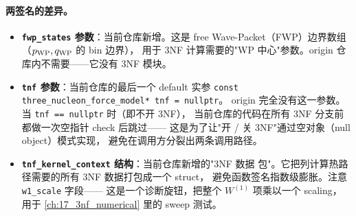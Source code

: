\paragraph{两签名的差异。}
\begin{itemize}
  \item \textbf{\texttt{fwp\_states} 参数}：当前仓库新增。这是 free
        Wave-Packet（FWP）边界数组（\(p_{\rm WP}, q_{\rm WP}\) 的 bin 边界），
        用于 3NF 计算需要的"WP 中心"参数。origin 仓库内不需要——它没有
        3NF 模块。
  \item \textbf{\texttt{tnf} 参数}：当前仓库的最后一个 default 实参
        \texttt{const three\_nucleon\_force\_model* tnf = nullptr}。
        origin 完全没有这一参数。当 \texttt{tnf == nullptr} 时（即不开 3NF），
        当前仓库的代码在所有 3NF 分支前都做一次空指针 check 后跳过——
        这是为了让"开 / 关 3NF"通过空对象（null object）模式实现，
        避免在调用方分裂出两条调用路径。
  \item \textbf{\texttt{tnf\_kernel\_context} 结构}：当前仓库新增的"3NF 数据
        包"。它把列计算热路径需要的所有 3NF 数据打包成一个 struct，
        避免函数签名指数级膨胀。注意 \texttt{w1\_scale} 字段——
        这是一个诊断旋钮，把整个 \(W^{(1)}\) 项乘以一个 scaling，
        用于 \cref{ch:17_3nf_numerical} 里的 sweep 测试。
\end{itemize}

